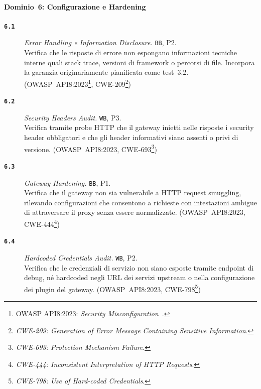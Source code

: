 \paragraph{Dominio~6: Configurazione e Hardening}
\begin{description}
      \item[\textbf{\texttt{6.1}}]
            \textit{Error Handling e Information Disclosure.} \texttt{BB}, P2.\\
            Verifica che le risposte di errore non espongano informazioni tecniche interne quali stack trace, versioni di framework o percorsi di file. Incorpora la garanzia originariamente pianificata come test~3.2.
            (\gls{OWASP}~API8:2023\footnote{\gls{OWASP} API8:2023: \textit{Security Misconfiguration}~\cite{OWASPTop10}.}, \gls{CWE}-209\footnote{\textit{CWE-209: Generation of Error Message Containing Sensitive Information}.})

      \item[\textbf{\texttt{6.2}}]
            \textit{Security Headers Audit.} \texttt{WB}, P3.\\
            Verifica tramite probe \gls{HTTP} che il gateway inietti nelle risposte i security header obbligatori e che gli header informativi siano assenti o privi di versione.
            (\gls{OWASP}~API8:2023, \gls{CWE}-693\footnote{\textit{CWE-693: Protection Mechanism Failure}.})

      \item[\textbf{\texttt{6.3}}]
            \textit{Gateway Hardening.} \texttt{BB}, P1.\\
            Verifica che il gateway non sia vulnerabile a \gls{HTTP} request smuggling, rilevando configurazioni che consentono a richieste con intestazioni ambigue di attraversare il proxy senza essere normalizzate.
            (\gls{OWASP}~API8:2023, \gls{CWE}-444\footnote{\textit{CWE-444: Inconsistent Interpretation of HTTP Requests}.})

      \item[\textbf{\texttt{6.4}}]
            \textit{Hardcoded Credentials Audit.} \texttt{WB}, P2.\\
            Verifica che le credenziali di servizio non siano esposte tramite endpoint di debug, né hardcoded negli \gls{URL} dei servizi upstream o nella configurazione dei plugin del gateway.
            (\gls{OWASP}~API8:2023, \gls{CWE}-798\footnote{\textit{CWE-798: Use of Hard-coded Credentials}.})
\end{description}

